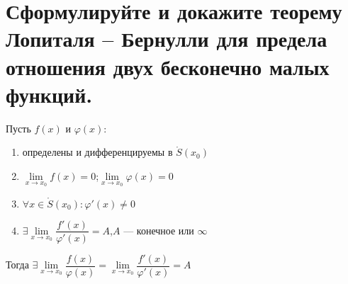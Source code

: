 \newpage
\section{Сформулируйте и докажите теорему Лопиталя – Бернулли для предела отношения двух бесконечно малых функций.}

\begin{theorem}
	Пусть $f(x)$ и $\varphi(x)$:
	\begin{enumerate}
		\item определены и дифференцируемы в $\mathring{S}(x_0)$
		\item $\lim\limits_{x \to x_0}f(x) = 0$;\quad $\lim\limits_{x\to x_0}\varphi(x) = 0$
		\item $\forall x \in \mathring{S}(x_0)\colon \varphi'(x)\ne 0$
		\item $\exists \lim\limits_{x \to x_0}\dfrac{f'(x)}{\varphi'(x)}= A$,\quad $A$ --- конечное или $\infty$
	\end{enumerate}
	Тогда $\exists \lim\limits_{x \to x_0} \dfrac{f(x)}{\varphi(x)} = \lim\limits_{x \to x_0}\dfrac{f'(x)}{\varphi'(x)}=A$
\end{theorem}
